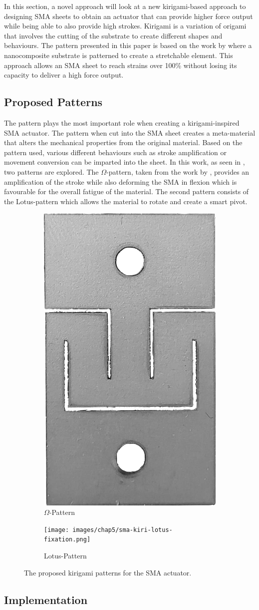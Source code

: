 In this section, a novel approach will look at a new kirigami-based approach to designing SMA sheets to obtain an actuator that can provide higher force output while being able to also provide high strokes. Kirigami is a variation of origami that involves the cutting of the substrate to create different shapes and behaviours. The pattern presented in this paper is based on the work by \cite{shyuKirigamiApproachEngineering2015} where a nanocomposite substrate is patterned to create a stretchable element. This approach allows an SMA sheet to reach strains over 100\% without losing its capacity to deliver a high force output.

\subsection{Proposed Patterns}
The pattern plays the most important role when creating a kirigami-inspired SMA actuator. The pattern when cut into the SMA sheet creates a meta-material that alters the mechanical properties from the original material. Based on the pattern used, various different behaviours such as stroke amplification or movement conversion can be imparted into the sheet. In this work, as seen in \todocite, two patterns are explored. The $\Omega$-pattern, taken from the work by \cite{shyuKirigamiApproachEngineering2015}, provides an amplification of the stroke while also deforming the SMA in flexion which is favourable for the overall fatigue of the material. The second pattern consists of the Lotus-pattern which allows the material to rotate and create a smart pivot.

\begin{figure}
     \centering
     \begin{subfigure}[b]{0.45\textwidth}
         \centering
         \includegraphics[height=0.5\textwidth]{images/chap5/sma-kiri-unit-grey.png}
         \caption{$\Omega$-Pattern}
         \label{fig:omega-pattern-simple}
     \end{subfigure}
     \begin{subfigure}[b]{0.45\textwidth}
         \centering
         \texttt{[image: images/chap5/sma-kiri-lotus-fixation.png]}
         \caption{Lotus-Pattern}
         \label{fig:lotus-pattern-simple}
     \end{subfigure}
    \caption{The proposed kirigami patterns for the SMA actuator.}
    \label{fig:sma-kiri-patterns}
\end{figure}


\subsection{Implementation}
